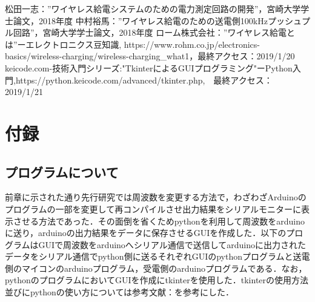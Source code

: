 \documentclass[12pt]{jarticle}
\begin{document}
\begin{thebibliography}{50}
	松田一志：”ワイヤレス給電システムのための電力測定回路の開発”，宮崎大学学士論文，2018年度
	中村裕馬：”ワイヤレス給電のための送電側100kHzプッシュプル回路”，宮崎大学学士論文，2018年度
	  ローム株式会社：”ワイヤレス給電とは”ーエレクトロニクス豆知識, https://www.rohm.co.jp/electronics-basics/wireless-charging/wireless-charging\_what1，最終アクセス：2019/1/20
	keicode.com-技術入門シリーズ:"TkinterによるGUIプログラミング"ーPython入門,https://python.keicode.com/advanced/tkinter.php,　最終アクセス：2019/1/21
	
\end{thebibliography}
\clearpage
\section{付録}
\subsection{プログラムについて}
前章に示された通り先行研究では周波数を変更する方法で，わざわざArduinoのプログラムの一部を変更して再コンパイルさせ出力結果をシリアルモニターに表示させる方法であった．その面倒を省くためpythonを利用して周波数をarduinoに送り，arduinoの出力結果をデータに保存させるGUIを作成した．以下のプログラムはGUIで周波数をarduinoへシリアル通信で送信してarduinoに出力されたデータをシリアル通信でpython側に送るそれぞれGUIのpythonプログラムと送電側のマイコンのarduinoプログラム，受電側のarduinoプログラムである．なお，pythonのプログラムにおいてGUIを作成にtkinterを使用した．tkinterの使用方法並びにpythonの使い方については参考文献：\cite{tkinter}を参考にした．
\end{document}
